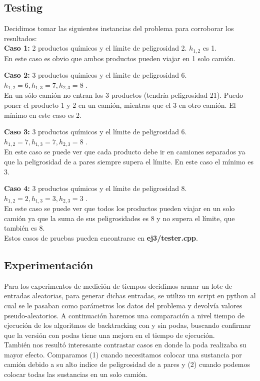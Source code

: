 \subsection{Testing}

Decidimos tomar las siguientes instancias del problema para corroborar los resultados:\\

\textbf{Caso 1:} 2 productos químicos y el límite de peligrosidad 2. $h_{1,2}$ es 1.\\
\indent En este caso es obvio que ambos productos pueden viajar en 1 solo camión.

\textbf{Caso 2:} 3 productos químicos y el límite de peligrosidad 6. $h_{1,2} = 6, h_{1,3} = 7, h_{2,3} = 8$ .\\
\indent En un sólo camión no entran los 3 productos (tendría peligrosidad 21). Puedo poner el producto 1 y 2 en un camión, mientras que el 3 en otro camión. El mínimo en este caso es 2.

\textbf{Caso 3:} 3 productos químicos y el límite de peligrosidad 6. $h_{1,2} = 7, h_{1,3} = 7, h_{2,3} = 8$ .\\
\indent En este caso se puede ver que cada producto debe ir en camiones separados ya que la peligrosidad de a pares siempre supera el límite. En este caso el mínimo es 3.

\textbf{Caso 4:} 3 productos químicos y el límite de peligrosidad 8. $h_{1,2} = 2, h_{1,3} = 3, h_{2,3} = 3$ .\\
\indent En este caso se puede ver que todos los productos pueden viajar en un solo camión ya que la suma de sus peligrosidades es 8 y no supera el límite, que también es 8.\\

Estos casos de pruebas pueden encontrarse en \textbf{ej3/tester.cpp}.

\subsection{Experimentación}

Para los experimentos de medici\'on de tiempos decidimos armar un lote de entradas aleatorias, para generar dichas entradas, se utilizo un script en python al cual se le pasaban como par\'ametros los datos del problema y devolv\'ia valores pseudo-aleatorios.
A continuaci\'on haremos una comparaci\'on a nivel tiempo de ejecución de los algoritmos de backtracking con y sin podas, buscando confirmar que la versi\'on con podas 
tiene una mejora en el tiempo de ejecuci\'on. \\
También nos resultó interesante contrastar casos en donde la poda realizaba su mayor efecto. Comparamos (1) cuando necesitamos colocar una sustancia por camión debido a su alto indice de peligrosidad de a pares y (2) cuando podemos colocar todas las sustancias en un solo camión.

